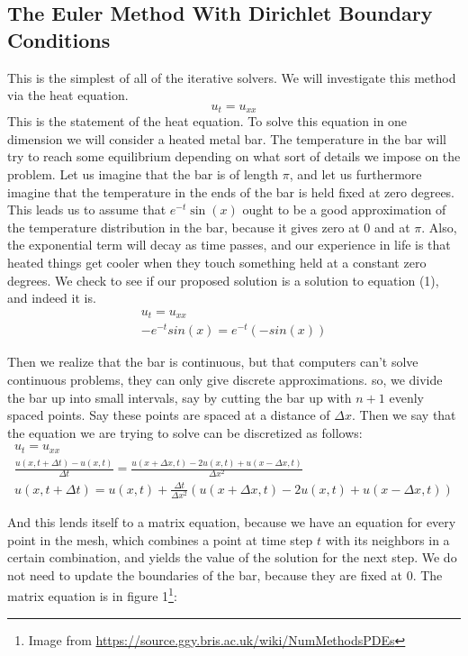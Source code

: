 \documentclass[a4paper]{article}
\begin{document}
\subsection{The Euler Method With Dirichlet Boundary Conditions}
This is the simplest of all of the iterative solvers. We will investigate this method via the heat equation.
\begin{equation}
u_t = u_{xx}
\end{equation}
This is the statement of the heat equation. To solve this equation in one dimension we will consider a heated metal bar. The temperature in the bar will try to reach some equilibrium depending on what sort of details we impose on the problem. Let us imagine that the bar is of length $\pi$, and let us furthermore imagine that the temperature in the ends of the bar is held fixed at zero degrees. This leads us to assume that $e^{-t}\sin(x)$ ought to be a good approximation of the temperature distribution in the bar, because it gives zero at $0$ and at $\pi$. Also, the exponential term will decay as time passes, and our experience in life is that heated things get cooler when they touch something held at a constant zero degrees. We check to see if our proposed solution is a solution to equation (1), and indeed it is.
\begin{gather}
u_t = u_{xx}\\
-e^{-t}sin(x) = e^{-t}(-sin(x))
\end{gather}

Then we realize that the bar is continuous, but that computers can't solve continuous problems, they can only give discrete approximations. 
so, we divide the bar up into small intervals, say by cutting the bar up with $n+1$ evenly spaced points. Say these points are spaced at a distance of $\Delta x$. Then we say that the equation we are trying to solve can be discretized as follows:
\begin{gather}
u_t = u_{xx}\\
\frac{u(x, t + \Delta t) - u(x, t)}{\Delta t} = \frac{u(x + \Delta x, t) - 2u(x, t) + u(x - \Delta x, t)}{\Delta x^2}\\
u(x, t + \Delta t) = u(x, t) + \frac{\Delta t}{\Delta x ^2}(u(x + \Delta x, t) - 2u(x, t) + u(x - \Delta x, t))
\end{gather}

And this lends itself to a matrix equation, because we have an equation for every point in the mesh, which combines a point at time step $t$ with its neighbors in a certain combination, and yields the value of the solution for the next step. We do not need to update the boundaries of the bar, because they are fixed at $0$. The matrix equation is in figure 1\footnote{Image from \url{https://source.ggy.bris.ac.uk/wiki/NumMethodsPDEs}}:
\end{document}
